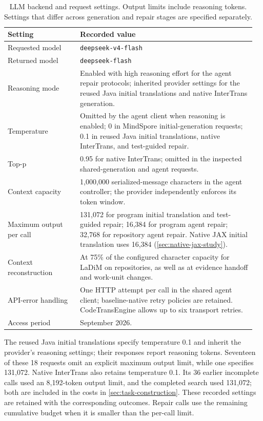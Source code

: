 \documentclass{article}
\begin{document}
\begin{table}[!htb]
\caption{LLM backend and request settings. Output limits include reasoning tokens. Settings that differ across generation and repair stages are specified separately.}
\label{tab:llm-settings}
\centering
\small
\begin{tabular}{@{}p{0.28\linewidth}p{0.68\linewidth}@{}}
\toprule
\textbf{Setting} & \textbf{Recorded value} \\
\midrule
Requested model & \texttt{deepseek-v4-flash} \\
Returned model & \texttt{deepseek-flash} \\
Reasoning mode & Enabled with high reasoning effort for the agent repair protocols; inherited provider settings for the reused Java initial translations and native InterTrans generation. \\
Temperature & Omitted by the agent client when reasoning is enabled; 0 in MindSpore initial-generation requests; 0.1 in reused Java initial translations, native InterTrans, and test-guided repair. \\
Top-p & 0.95 for native InterTrans; omitted in the inspected shared-generation and agent requests. \\
Context capacity & 1,000,000 serialized-message characters in the agent controller; the provider independently enforces its token window. \\
Maximum output per call & 131,072 for program initial translation and test-guided repair; 16,384 for program agent repair; 32,768 for repository agent repair. Native JAX initial translation uses 16,384 (\cref{sec:native-jax-study}). \\
Context reconstruction & At 75\% of the configured character capacity for LaDiM on repositories, as well as at evidence handoff and work-unit changes. \\
API-error handling & One HTTP attempt per call in the shared agent client; baseline-native retry policies are retained. CodeTransEngine allows up to six transport retries. \\
Access period & September 2026. \\
\bottomrule
\end{tabular}
\end{table}

The reused Java initial translations specify temperature 0.1 and inherit the provider's reasoning settings; their responses report reasoning tokens. Seventeen of these 18 requests omit an explicit maximum output limit, while one specifies 131,072. Native InterTrans also retains temperature 0.1. Its 36 earlier incomplete calls used an 8,192-token output limit, and the completed search used 131,072; both are included in the costs in \cref{sec:task-construction}. These recorded settings are retained with the corresponding outcomes. Repair calls use the remaining cumulative budget when it is smaller than the per-call limit.
\end{document}
